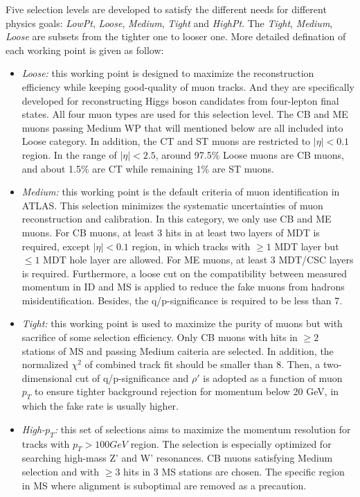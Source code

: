 Five selection levels are developed to satisfy the different needs for different physics goals: \textit{LowPt}, \textit{Loose}, \textit{Medium}, \textit{Tight} and \textit{HighPt}.
The \textit{Tight}, \textit{Medium}, \textit{Loose} are subsets from the tighter one to looser one.
More detailed defination of each working point is given as follow:
\begin{itemize}
	\item \textit{Loose:} this working point is designed to maximize the reconstruction efficiency while keeping good-quality of muon tracks. And they are specifically developed for reconstructing Higgs boson candidates from four-lepton final states. All four muon types are used for this selection level. The CB and ME muons passing Medium WP that will mentioned below are all included into Loose category. In addition, the CT and ST muons are restricted to $|\eta| < 0.1$ region.
In the range of $|\eta| < 2.5$, around 97.5\% Loose muons are CB muons, and about 1.5\% are CT while remaining 1\% are ST muons.
	\item \textit{Medium:} this working point is the default criteria of muon identification in ATLAS. This selection minimizes the systematic uncertainties of muon reconstruction and calibration. In this category, we only use CB and ME muons. For CB muons, at least 3 hits in at least two layers of MDT is required, except $|\eta| < 0.1$ region, in which tracks with $\geq 1$ MDT layer but $\leq 1$ MDT hole layer are allowed. For ME muons, at least 3 MDT/CSC layers is required.
Furthermore, a loose cut on the compatibility between measured momentum in ID and MS is applied to reduce the fake muons from hadrons misidentification. Besides, the q/p-significance is required to be less than 7.
	\item \textit{Tight:} this working point is used to maximize the purity of muons but with sacrifice of some selection efficiency. Only CB muons with hits in $\geq 2$ stations of MS and passing Medium caiteria are selected.
In addition, the normalized $\chi^{2}$ of combined track fit should be smaller than 8. Then, a two-dimensional cut of q/p-significance and $\rho'$ is adopted as a function of muon $p_{T}$ to ensure tighter background rejection for momentum below 20 GeV, in which the fake rate is usually higher.
	\item \textit{High-$p_{T}$:} this set of selections aims to maximize the momentum resolution for tracks with $p_{T} > 100 GeV$ region. The selection is especially optimized for searching high-mass Z' and W' resonances. CB muons satisfying Medium selection and with $\geq 3$ hits in 3 MS stations are chosen. The specific region in MS where alignment is suboptimal are removed as a precaution.

\end{itemize}
